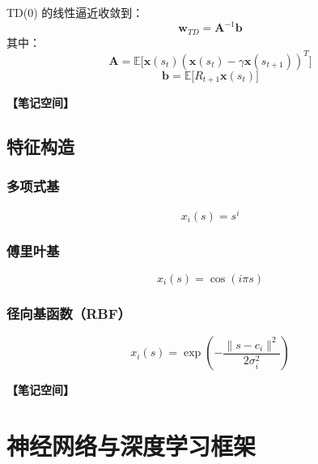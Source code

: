 \documentclass[12pt,a4paper]{article}
\newcommand{\notespace}[1][3cm]{%
  \vspace{#1}%
  \noindent\textbf{【笔记空间】}%
  \vspace{#1}%
}
\newcommand{\E}{\mathbb{E}}
\newcommand{\1}{\mathbf{1}}
\begin{document}
TD(0) 的线性逼近收敛到：
\begin{equation}
\mathbf{w}_{TD}=\mathbf{A}^{-1}\mathbf{b}
\end{equation}
其中：
\begin{equation}
\mathbf{A}=\E\bigl[\mathbf{x}(s_t)(\mathbf{x}(s_t)-\gamma\mathbf{x}(s_{t+1}))^T\bigr]
\end{equation}
\begin{equation}
\mathbf{b}=\E\bigl[R_{t+1}\mathbf{x}(s_t)\bigr]
\end{equation}

\notespace[2cm]

\subsection{特征构造}

\subsubsection*{多项式基}

\begin{equation}
x_i(s)=s^i
\end{equation}

\subsubsection*{傅里叶基}

\begin{equation}
x_i(s)=\cos(i\pi s)
\end{equation}

\subsubsection*{径向基函数（RBF）}

\begin{equation}
x_i(s)=\exp\left(-\frac{\|s-c_i\|^2}{2\sigma_i^2}\right)
\end{equation}

\notespace[3cm]

\newpage

\section{神经网络与深度学习框架}
\end{document}
